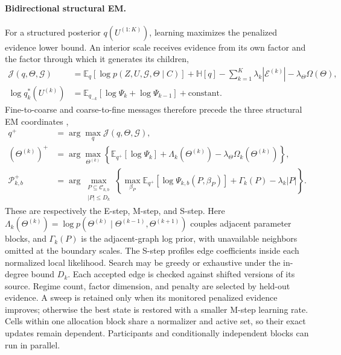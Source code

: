 \paragraph{Bidirectional structural EM.}

For a structured posterior \(q(U^{(1:K)})\), learning maximizes the penalized
evidence lower bound. An interior scale receives evidence from its own factor
and the factor through which it generates its children,
\begin{align}
 \mathcal J(q,\Theta,\mathcal G)
 &=\mathbb E_q[\log p(Z,U,\mathcal G,\Theta\mid C)]
   +\mathbb H[q]
   -\sum_{k=1}^K\lambda_k|\mathcal E^{(k)}|
   -\lambda_\Theta\Omega(\Theta),
 \label{eq:model_elbo}\\
 \log q_k^*(U^{(k)})
 &=\mathbb E_{q_{-k}}[\log\Psi_k+\log\Psi_{k-1}]+\mathrm{constant}.
 \label{eq:model_bidirectional_update}
\end{align}
Fine-to-coarse and coarse-to-fine messages therefore precede the three
structural EM coordinates \citep{friedman1998learning},
\begin{align}
 q^+&=\arg\max_q\mathcal J(q,\Theta,\mathcal G),
 \label{eq:model_em_steps}\\
 (\Theta^{(k)})^+
 &=\arg\max_{\Theta^{(k)}}\left\{
 \mathbb E_{q^+}[\log\Psi_k]+\Lambda_k(\Theta^{(k)})
 -\lambda_\Theta\Omega_k(\Theta^{(k)})\right\},
 \label{eq:model_parameter_step}\\
 \mathcal P_{k,b}^+
 &=\arg\max_{\substack{P\subseteq\mathcal C_{k,b}\\|P|\leq D_k}}
 \left\{\max_{\beta_P}\mathbb E_{q^+}[\log\Psi_{k,b}(P,\beta_P)]
 +\Gamma_k(P)-\lambda_k|P|\right\}.
 \label{eq:model_structure_step}
\end{align}
These are respectively the E-step, M-step, and S-step. Here
\(\Lambda_k(\Theta^{(k)})=\log p(\Theta^{(k)}\mid
\Theta^{(k-1)},\Theta^{(k+1)})\) couples adjacent parameter blocks, and
\(\Gamma_k(P)\) is the adjacent-graph log prior, with unavailable neighbors
omitted at the boundary scales. The S-step profiles edge
coefficients inside each normalized local likelihood. Search may be
greedy or exhaustive under the in-degree bound \(D_k\). Each accepted edge is
checked against shifted versions of its source. Regime count, factor dimension,
and penalty are selected by held-out evidence. A sweep is retained only when
its monitored penalized evidence improves; otherwise the best state is
restored with a smaller M-step learning rate. Cells within one allocation
block share a normalizer and active set, so their exact updates remain
dependent. Participants and conditionally independent blocks can run in
parallel.

